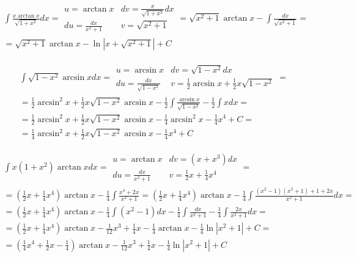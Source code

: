 
\begin{gather*}\int \frac{x\arctan x}{\sqrt{1+x^2}}dx = \begin{array}{|ll|}
u=\arctan x & dv=\frac{x}{\sqrt{1+x^2}}dx \\
du=\frac{dx}{x^2+1} & v=\sqrt{x^2+1}
\end{array} = \sqrt{x^2+1}\arctan x - \int \frac{dx}{\sqrt{x^2+1}} = \\ = \sqrt{x^2+1}\arctan x - \ln|x+\sqrt{x^2+1}|+C\end{gather*}



\begin{gather*}\int \sqrt{1-x^2}\arcsin x dx = \begin{array}{|ll|}
u=\arcsin x & dv=\sqrt{1-x^2}dx \\
du=\frac{dx}{\sqrt{1-x^2}} & v=\frac{1}{2}\arcsin x + \frac{1}{2}x\sqrt{1-x^2}
\end{array} = \\ = \frac{1}{2}\arcsin^2x+\frac{1}{2}x\sqrt{1-x^2}\arcsin x - \frac{1}{2}\int \frac{\arcsin x}{\sqrt{1-x^2}}-\frac{1}{2}\int xdx = \\ = \frac{1}{2}\arcsin^2x+\frac{1}{2}x\sqrt{1-x^2}\arcsin x - \frac{1}{4}\arcsin^2 x-\frac{1}{4}x^4+C = \\ = \frac{1}{4}\arcsin^2x+\frac{1}{2}x\sqrt{1-x^2}\arcsin x -\frac{1}{4}x^4+C\end{gather*}



\begin{gather*}\int x(1+x^2)\arctan x dx = \begin{array}{|ll|}
u=\arctan x & dv=(x+x^3)dx \\
du=\frac{dx}{x^2+1} & v=\frac{1}{2}x+\frac{1}{4}x^4
\end{array} = \\ = (\frac{1}{2}x+\frac{1}{4}x^4)\arctan x - \frac{1}{4}\int \frac{x^4+2x}{x^2+1} = (\frac{1}{2}x+\frac{1}{4}x^4)\arctan x - \frac{1}{4}\int \frac{(x^2-1)(x^2+1)+1+2x}{x^2+1}dx = \\ = (\frac{1}{2}x+\frac{1}{4}x^4)\arctan x - \frac{1}{4}\int(x^2-1)dx-\frac{1}{4}\int \frac{dx}{x^2+1}-\frac{1}{4}\int \frac{2x}{x^2+1}dx = \\ =(\frac{1}{2}x+\frac{1}{4}x^4)\arctan x - \frac{1}{12}x^3+\frac{1}{4}x-\frac{1}{4}\arctan x-\frac{1}{4}\ln|x^2+1|+C = \\ =(\frac{1}{4}x^4+\frac{1}{2}x-\frac{1}{4})\arctan x - \frac{1}{12}x^3+\frac{1}{4}x-\frac{1}{4}\ln|x^2+1|+C\end{gather*}


